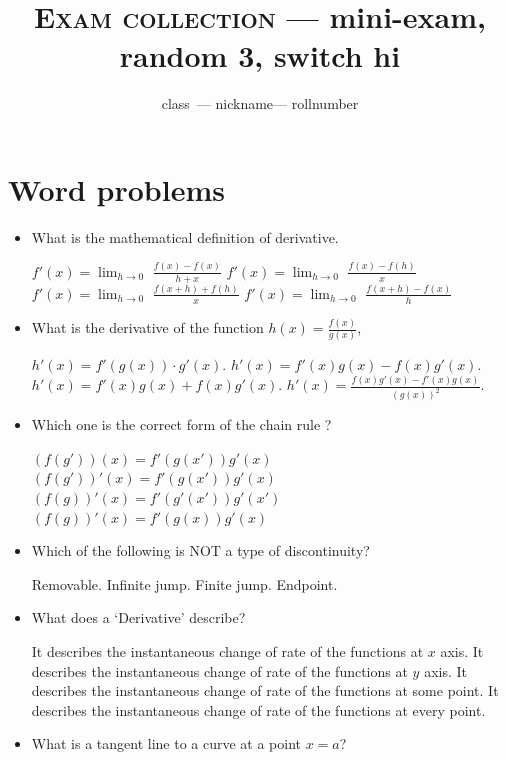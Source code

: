 \documentclass{exam}
\newcommand{\randomnumber}{3}
\newcommand{\switchnumber}{hi}
\newcommand{\class}{class}
\newcommand{\rollnumber}{rollnumber}
\newcommand{\nickname}{nickname}
\begin{document}
\author{\class\ --- \nickname --- \rollnumber}
\title{\textsc{Exam collection} --- mini-exam, random \randomnumber, switch \switchnumber }


\maketitle



\section{Word problems}\begin{itemize}

	\item What is the mathematical definition of derivative.

	\begin{choices}
		\choice $f'(x) = \lim_{h\to 0}$ $\frac{f(x)-f(x)}{h+x}$
		\choice $f'(x) = \lim_{h\to 0}$ $\frac{f(x)-f(h)}{x}$
		\choice $f'(x) = \lim_{h\to 0}$ $\frac{f(x+h)+f(h)}{x}$
		\CorrectChoice $f'(x) = \lim_{h\to 0}$ $\frac{f(x+h)-f(x)}{h}$
	\end{choices}
	\item What is the derivative of the function $h(x) = \frac{f(x)}{g(x)}$,

	\begin{choices}
		\choice $h'(x) = f'(g(x)) \cdot g'(x).$
		\choice $h'(x) = f'(x)g(x)-f(x)g'(x).$
		\choice $h'(x) = f'(x)g(x)+f(x)g'(x).$
		\CorrectChoice $h'(x) = \frac{f(x)g'(x)-f'(x)g(x)}{(g(x))^2}.$
	\end{choices}

	\item Which one is the correct form of the chain rule ?

	\begin{choices}
		\choice $(f(g'))(x)=f'(g(x'))g'(x)$
		\choice $(f(g'))'(x)=f'(g(x'))g'(x)$
		\choice $(f(g))'(x)=f'(g'(x'))g'(x')$
		\CorrectChoice $(f(g))'(x)=f'(g(x))g'(x)$
	\end{choices}

	\item Which of the following is NOT a type of discontinuity?

	\begin{choices}
		\choice Removable.
		\choice Infinite jump.
		\choice Finite jump.
		\CorrectChoice Endpoint.
	\end{choices}

	\item What does a `Derivative' describe?
	\begin{choices}
		\choice It describes the instantaneous change of rate of the functions at $x$ axis.
		\choice It describes the instantaneous change of rate of the functions at $y$ axis.
		\choice It describes the instantaneous change of rate of the functions at some point.
		\CorrectChoice It describes the instantaneous change of rate of the functions at every point.
	\end{choices}
	\item What is a tangent line to a curve at a point $x = a$?


\end{itemize}
\end{document}
